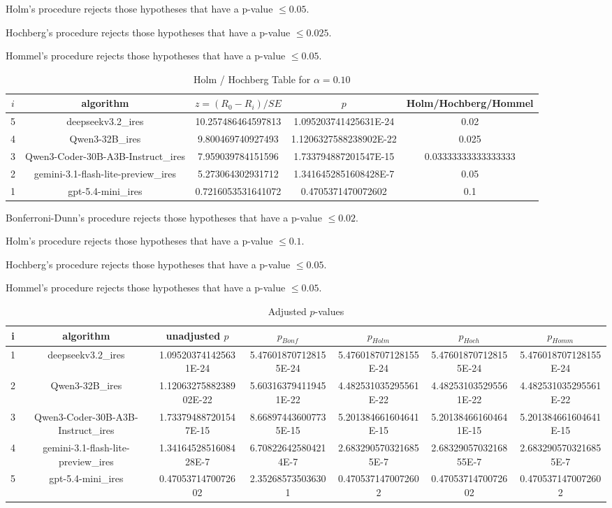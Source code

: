 \documentclass[a4paper,10pt]{article}
\begin{document}
\begin{landscape}
Holm's procedure rejects those hypotheses that have a p-value $\le0.05$.


Hochberg's procedure rejects those hypotheses that have a p-value $\le0.025$.


Hommel's procedure rejects those hypotheses that have a p-value $\le0.05$.


\begin{table}[!htp]
\centering\tiny
\caption{Holm / Hochberg Table for $\alpha=0.10$}
\begin{tabular}{ccccc}
$i$&algorithm&$z=(R_0 - R_i)/SE$&$p$&Holm/Hochberg/Hommel\\
\hline
5&deepseekv3.2_ires&10.257486464597813&1.095203741425631E-24&0.02\\
4&Qwen3-32B_ires&9.800469740927493&1.1206327588238902E-22&0.025\\
3&Qwen3-Coder-30B-A3B-Instruct_ires&7.959039784151596&1.733794887201547E-15&0.03333333333333333\\
2&gemini-3.1-flash-lite-preview_ires&5.273064302931712&1.3416452851608428E-7&0.05\\
1&gpt-5.4-mini_ires&0.7216053531641072&0.4705371470072602&0.1\\
\hline
\end{tabular}
\end{table}
Bonferroni-Dunn's procedure rejects those hypotheses that have a p-value $\le0.02$.


Holm's procedure rejects those hypotheses that have a p-value $\le0.1$.


Hochberg's procedure rejects those hypotheses that have a p-value $\le0.05$.


Hommel's procedure rejects those hypotheses that have a p-value $\le0.05$.


\begin{table}[!htp]
\centering\tiny
\caption{Adjusted $p$-values}
\begin{tabular}{ccccccc}
i&algorithm&unadjusted $p$&$p_{Bonf}$&$p_{Holm}$&$p_{Hoch}$&$p_{Homm}$\\
\hline
1&deepseekv3.2_ires&1.095203741425631E-24&5.476018707128155E-24&5.476018707128155E-24&5.476018707128155E-24&5.476018707128155E-24\\
2&Qwen3-32B_ires&1.1206327588238902E-22&5.603163794119451E-22&4.482531035295561E-22&4.482531035295561E-22&4.482531035295561E-22\\
3&Qwen3-Coder-30B-A3B-Instruct_ires&1.733794887201547E-15&8.668974436007735E-15&5.201384661604641E-15&5.201384661604641E-15&5.201384661604641E-15\\
4&gemini-3.1-flash-lite-preview_ires&1.3416452851608428E-7&6.708226425804214E-7&2.6832905703216855E-7&2.6832905703216855E-7&2.6832905703216855E-7\\
5&gpt-5.4-mini_ires&0.4705371470072602&2.352685735036301&0.4705371470072602&0.4705371470072602&0.4705371470072602\\
\hline
\end{tabular}
\end{table}


\end{landscape}
\end{document}
